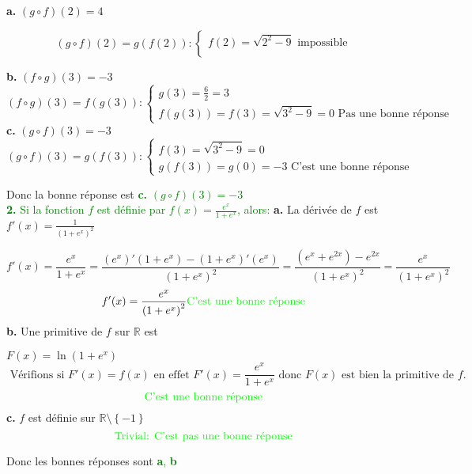 \documentclass[12pt]{article}
\begin{document}
\textbf{a.} $(g\circ f)(2)=4$

\[
(g\circ f)(2)=g(f(2)):
\begin{cases}
f(2)=\sqrt{2^{2}-9} \text{ impossible }\\
\end{cases}
\]

\textbf{b.} $(f\circ g)(3)=-3$
 \[
(f\circ g)(3)=f(g(3)):
\begin{cases}
g(3)=\frac{6}{2}=3\\
f(g(3))=f(3)=\sqrt{3^{2}-9}=0 \text{ Pas une bonne réponse }
\end{cases}
\]
\textbf{c.} $(g\circ f)(3)=-3$
\[
(g\circ f)(3)=g(f(3)):
\begin{cases}
f(3)=\sqrt{3^{2}-9}=0\\
g(f(3))=g(0)=-3 \text{ C'est une bonne réponse }
\end{cases}
\]

Donc la bonne réponse est \textcolor{green}{\textbf{c.} $(g\circ f)(3)=-3$}\\

\textcolor{green}{ \textbf{2.} Si la fonction $f$ est définie par $f(x)=\frac{e^{x}}{1+e^{x}}$, alors: }
\newpage
\textbf{a.} La dérivée de $f$ est $f'(x)=\frac{1}{\left(1+e^{x}\right)^{2}}$

\[
f'(x)=\frac{e^{x}}{1+e^{x}}=\frac{(e^{x})'(1+e^{x})-(1+e^{x})'(e^{x})}{\left( 1+e^{x} \right)^{2}  }=\frac{(e^{x}+e^{2x})-e^{2x}}{\left( 1+e^{x} \right)^{2}}=\frac{e^{x}}{\left( 1+e^{x} \right)^{2}}
\]
\[f'(x)=\frac{e^{x}}{\left( 1+e^{x} \right)^{2}} \text{\textcolor{green} {C'est une bonne réponse }}\]
\textbf{b.} Une primitive de $f$ sur $\mathbb{R}$ est

$F(x)=\ln(1+e^{x})$
\[\text{ Vérifions si } F'(x)=f(x) \text{ en effet } F'(x)=\frac{e^{x}}{1+e^{x}} \text{ donc } F(x) \text{ est bien la primitive de } f. \]
\[\text{\textcolor{green} {C'est une bonne réponse }}\]
\textbf{c.} $f$ est définie sur $\mathbb{R}\setminus\left\lbrace -1\right\rbrace $
\[\text{\textcolor{green} {Trivial: C'est pas une bonne réponse }}\]

Donc les bonnes réponses sont \textcolor{green}{\textbf{a}, \textbf{b}}\\

\end{document}
